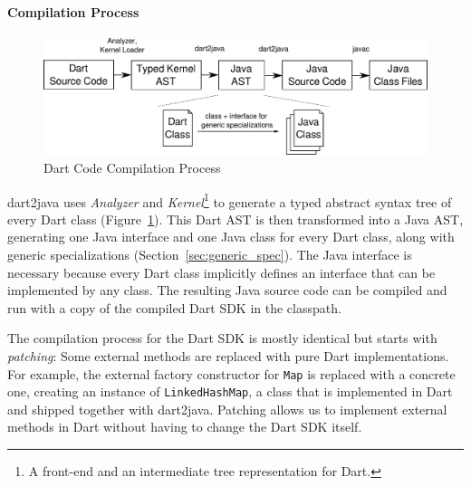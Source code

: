 \documentclass[sigplan]{acmart}
\begin{document}
\paragraph{Compilation Process}
\begin{figure}[!tp]
    \includegraphics[width=\columnwidth]{dart2java_compile_user_code.pdf}
    \caption{Dart Code Compilation Process}
    \label{fig:user_code_compilation}
\end{figure}
dart2java uses \emph{Analyzer} and \emph{Kernel}\footnote{A front-end and an intermediate tree representation for Dart.} to generate a typed abstract syntax tree of every Dart class (Figure~\ref{fig:user_code_compilation}). This Dart AST is then transformed into a Java AST, generating one Java interface and one Java class for every Dart class, along with generic specializations (Section~\ref{sec:generic_spec}). The Java interface is necessary because every Dart class implicitly defines an interface that can be implemented by any class. The resulting Java source code can be compiled and run with a copy of the compiled Dart SDK in the classpath.

The compilation process for the Dart SDK is mostly identical but starts with \emph{patching}: Some external methods are replaced with pure Dart implementations. For example, the external factory constructor for \texttt{Map} is replaced with a concrete one, creating an instance of \texttt{LinkedHashMap}, a class that is implemented in Dart and shipped together with dart2java. Patching allows us to implement external methods in Dart without having to change the Dart SDK itself.
\end{document}

